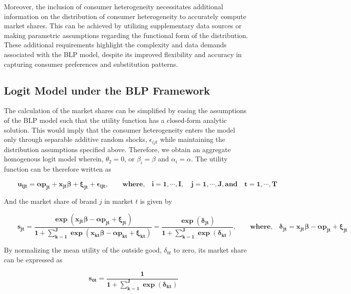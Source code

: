 \documentclass[a4paper,11pt]{article}
\begin{document}
    Moreover, the inclusion of consumer heterogeneity necessitates additional information on the distribution of consumer heterogeneity to accurately compute market shares. This can be achieved by utilizing supplementary data sources or making parametric assumptions regarding the functional form of the distribution. These additional requirements highlight the complexity and data demands associated with the BLP model, despite its improved flexibility and accuracy in capturing consumer preferences and substitution patterns.
    
\subsection{Logit Model under the BLP Framework}
\label{subsec: MNL}

    The calculation of the market shares can be simplified by easing the assumptions of the BLP model such that the utility function has a closed-form analytic solution. This would imply that the consumer heterogeneity enters the model only through separable additive random shocks, $\epsilon_{ijt}$ while maintaining the distribution assumptions specified above. Therefore, we obtain an aggregate homogenous logit model wherein, $\theta_{2} = 0$, or $\beta_{i} = \beta$ and $\alpha_{i} = \alpha$. The utility function can be therefore written as

    \begin{equation*}
        \qquad \mathbf{u_{ijt} = \alpha p_{jt} + x_{jt}\beta + \xi_{jt} + \epsilon_{ijt}, \qquad \text{where,}\quad i = 1,\cdots,I, \quad j = 1,\cdots,J, \text{and}\quad t = 1,\cdots,T}
    \end{equation*}

    And the market share of brand $j$ in market $t$ is given by

    \begin{equation*}
        \qquad \mathbf{s_{jt} = \dfrac{\exp(x_{jt}\beta - \alpha p_{jt} + \xi_{jt})}
        {1 + \sum_{k=1}^{J} \exp(x_{kt}\beta - \alpha p_{kt} + \xi_{kt})} =
        \dfrac{\exp(\delta_{jt})}{1 + \sum_{k=1}^{J} \exp(\delta_{kt})}, \qquad \text{where,} \quad \delta_{jt} = x_{jt}\beta - \alpha p_{jt} + \xi_{jt}}
    \end{equation*}

    By normalizing the mean utility of the outside good, $\delta_{0t}$ to zero, its market share can be expressed as

    \begin{equation*}
        \qquad \mathbf{s_{0t} = \dfrac{1}
        {1 + \sum_{k=1}^{J} \exp(\delta_{kt})}}
    \end{equation*}
\end{document}
